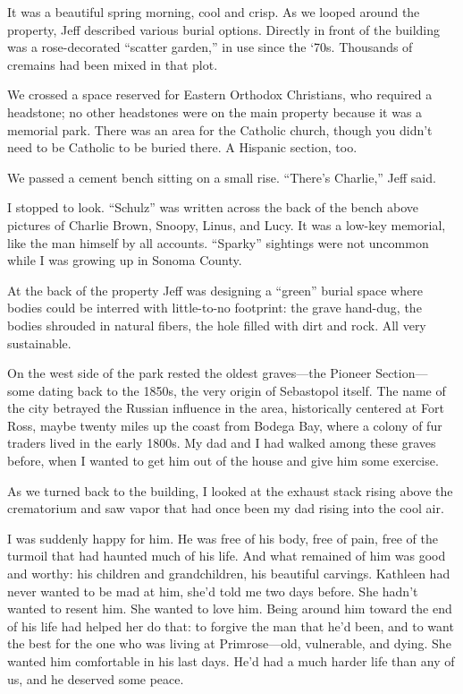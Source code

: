 \documentclass[12pt]{book}
\begin{document}
It was a beautiful spring morning, cool and crisp. As we looped around the property, Jeff described various burial options. Directly in front of the building was a rose-decorated ``scatter garden,'' in use since the `70s. Thousands of cremains had been mixed in that plot.

We crossed a space reserved for Eastern Orthodox Christians, who required a headstone; no other headstones were on the main property because it was a memorial park. There was an area for the Catholic church, though you didn't need to be Catholic to be buried there. A Hispanic section, too.

We passed a cement bench sitting on a small rise. ``There's Charlie,'' Jeff said.

I stopped to look. ``Schulz'' was written across the back of the bench above pictures of Charlie Brown, Snoopy, Linus, and Lucy. It was a low-key memorial, like the man himself by all accounts. ``Sparky'' sightings were not uncommon while I was growing up in Sonoma County.

At the back of the property Jeff was designing a ``green'' burial space where bodies could be interred with little-to-no footprint: the grave hand-dug, the bodies shrouded in natural fibers, the hole filled with dirt and rock. All very sustainable.

On the west side of the park rested the oldest graves---the Pioneer Section--- some dating back to the 1850s, the very origin of Sebastopol itself. The name of the city betrayed the Russian influence in the area, historically centered at Fort Ross, maybe twenty miles up the coast from Bodega Bay, where a colony of fur traders lived in the early 1800s. My dad and I had walked among these graves before, when I wanted to get him out of the house and give him some exercise.

As we turned back to the building, I looked at the exhaust stack rising above the crematorium and saw vapor that had once been my dad rising into the cool air.

I was suddenly happy for him. He was free of his body, free of pain, free of the turmoil that had haunted much of his life. And what remained of him was good and worthy: his children and grandchildren, his beautiful carvings. Kathleen had never wanted to be mad at him, she'd told me two days before. She hadn't wanted to resent him. She wanted to love him. Being around him toward the end of his life had helped her do that: to forgive the man that he'd been, and to want the best for the one who was living at Primrose---old, vulnerable, and dying. She wanted him comfortable in his last days. He'd had a much harder life than any of us, and he deserved some peace.
\end{document}
